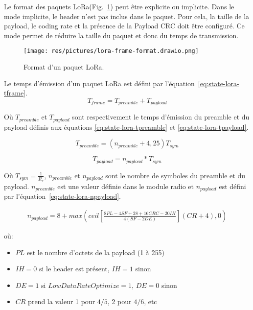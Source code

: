 \vspace{1cm}
Le format des paquets LoRa(Fig.~\ref{fig:state-lora-frame-format}) peut être explicite ou implicite.
Dans le mode implicite, le header n'est pas inclus dans le paquet. Pour cela, la taille de la payload, le coding rate et la présence de la Payload CRC doit être configuré.
Ce mode permet de réduire la taille du paquet et donc du temps de transmission.

\begin{figure}[H]
    \centering
    \texttt{[image: res/pictures/lora-frame-format.drawio.png]}
    \caption{Format d'un paquet LoRa.}
    \label{fig:state-lora-frame-format}
\end{figure}

Le temps d'émission d'un paquet LoRa est défini par l'équation~\ref{eq:state-lora-tframe}.
\begin{equation}\label{eq:state-lora-tframe}
    T_{frame} = T_{preamble} + T_{payload}
\end{equation}

Où $T_{preamble}$ et $T_{payload}$ sont respectivement le temps d'émission du preamble et du payload définis aux équations \ref{eq:state-lora-tpreamble} et \ref{eq:state-lora-tpayload}.

\begin{equation}\label{eq:state-lora-tpreamble}
    T_{preamble} = (n_{preamble} + 4,25)T_{sym}
\end{equation}

\begin{equation}\label{eq:state-lora-tpayload}
    T_{payload} = n_{payload} * T_{sym}
\end{equation}

Où $T_{sym} = \frac{1}{R_s}$, $n_{preamble}$ et $n_{payload}$ sont le nombre de symboles du preamble et du payload. $n_{preamble}$ est une valeur définie dans le module radio et $n_{payload}$ est défini par l'équation~\ref{eq:state-lora-npayload}.

\begin{equation}\label{eq:state-lora-npayload}
    \begin{split}
    n_{payload} =8 +max
     \left( ceil \left[ \frac{8PL - 4SF + 28 + 16CRC - 20IH}{4(SF-2DE)} \right] (CR+4), 0 \right)
    \end{split}
\end{equation}

où:
\begin{itemize}
    \item $PL$ est le nombre d'octets de la payload (1 à 255)
    \item $IH=0$ si le header est présent, $IH=1$ sinon
    \item $DE=1$ si $LowDataRateOptimize=1$, $DE=0$ sinon
    \item $CR$ prend la valeur 1 pour $4/5$, 2 pour $4/6$, etc
\end{itemize}

